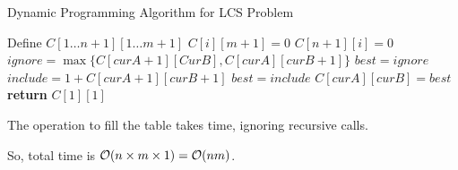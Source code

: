 \begin{algorithm}[H]
\caption{Dynamic Programming Algorithm for LCS Problem}\label{dp_lcs_alg}
\begin{algorithmic}[1]
        \State Define $C[1 \ldots n+1][1 \ldots m+1]$
            \State $C[i][m+1]=0$
        \EndFor
            \State $C[n+1][i]=0$
        \EndFor
                \State $ignore = \max\{C[curA+1][CurB], C[curA][curB+1]\}$
                \State $best = ignore$
                    \State $include = 1 + C[curA+1][curB+1]$
                        \State $best = include$
                    \EndIf
                \EndIf
                \State $C[curA][curB] = best$
            \EndFor
        \EndFor
        \State \textbf{return} $C[1][1]$
    \EndProcedure
\end{algorithmic}
\end{algorithm}

The operation to fill the table takes  time, ignoring recursive calls.

So, total time is $\mathcal{O}(n\times m\times 1) = \mathcal{O}(nm)$.
